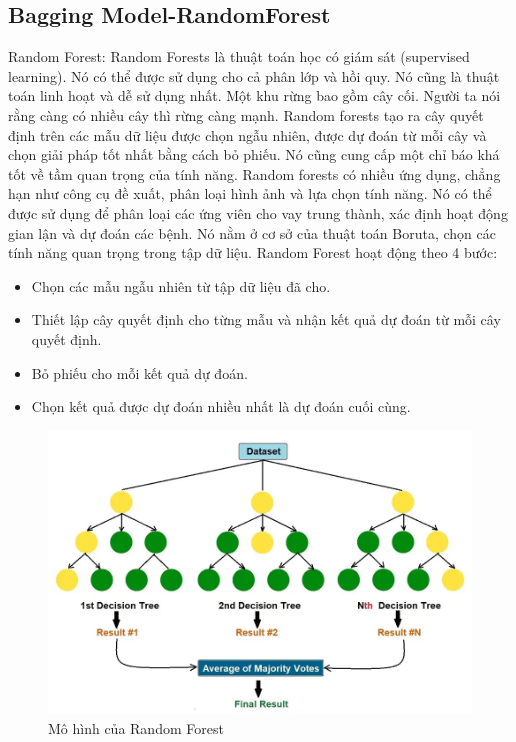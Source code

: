 \documentclass[conference]{IEEEtran}
\begin{document}
\subsection{Bagging Model-RandomForest}
Random Forest:
Random Forests là thuật toán học có giám sát (supervised learning). Nó có thể được sử dụng cho cả phân lớp và hồi quy. Nó cũng là thuật toán linh hoạt và dễ sử dụng nhất. Một khu rừng bao gồm cây cối. Người ta nói rằng càng có nhiều cây thì rừng càng mạnh. Random forests tạo ra cây quyết định trên các mẫu dữ liệu được chọn ngẫu nhiên, được dự đoán từ mỗi cây và chọn giải pháp tốt nhất bằng cách bỏ phiếu. Nó cũng cung cấp một chỉ báo khá tốt về tầm quan trọng của tính năng. Random forests có nhiều ứng dụng, chẳng hạn như công cụ đề xuất, phân loại hình ảnh và lựa chọn tính năng. Nó có thể được sử dụng để phân loại các ứng viên cho vay trung thành, xác định hoạt động gian lận và dự đoán các bệnh. Nó nằm ở cơ sở của thuật toán Boruta, chọn các tính năng quan trọng trong tập dữ liệu.
Random Forest hoạt động theo 4 bước:
\begin{itemize}
    \item Chọn các mẫu ngẫu nhiên từ tập dữ liệu đã cho.
    \item Thiết lập cây quyết định cho từng mẫu và nhận kết quả dự đoán từ mỗi cây quyết định.
    \item Bỏ phiếu cho mỗi kết quả dự đoán.
    \item Chọn kết quả được dự đoán nhiều nhất là dự đoán cuối cùng.
\end{itemize}

\begin{figure} [H]
    \centering
    \begin{minipage}{0.3\textwidth}
    \includegraphics[width=1\textwidth]{bibliography/pictures/RandomForest.jpg}
    \caption{Mô hình của Random Forest}
    \end{minipage}  
\end{figure}
\end{document}
